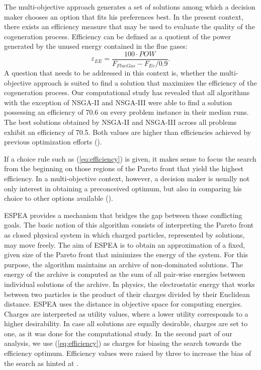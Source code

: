 The multi-objective approach generates a set of solutions among which a decision maker chooses an option that fits his preferences best. In the present context, there exists an efficiency measure that may be used to evaluate the quality of the cogeneration process. Efficiency can be defined as a quotient of the power generated by the unused energy contained in the flue gases:
%
\begin{equation}
\label{eq:efficiency}
\varepsilon_{EE} = \frac{100 \cdot POW}{F_{FlueGas} - F_{Ev}/0.9}.
\end{equation}
%
A question that needs to be addressed in this context is, whether the multi-objective approach is suited to find a solution that maximizes the efficiency of the cogeneration process. Our computational study has revealed that all algorithms with the exception of NSGA-II and NSGA-III were able to find a solution possessing an efficiency of 70.6 on every problem instance in their median runs. The best solutions obtained by NSGA-II and NSGA-III across all problems exhibit an efficiency of 70.5. Both values are higher than efficiencies achieved by previous optimization efforts (\cite{Seijo2016309}).

If a choice rule such as (\ref{eq:efficiency}) is given, it makes sense to focus the search from the beginning on those regions of the Pareto front that yield the highest efficiency. In a multi-objective context, however, a decision maker is usually not only interest in obtaining a preconceived optimum, but also in comparing his choice to other options available (\cite{roy1996multicriteria,kahneman1979prospect}).

ESPEA provides a mechanism that bridges the gap between those conflicting goals. The basic notion of this algorithm consists of interpreting the Pareto front as closed physical system in which charged particles, represented by solutions, may move freely. The aim of ESPEA is to obtain an approximation of a fixed, given size of the Pareto front that minimizes the energy of the system. For this purpose, the algorithm maintains an archive of non-dominated solutions. The energy of the archive is computed as the sum of all pair-wise energies between individual solutions of the archive. In physics, the electrostatic energy that works between two particles is the product of their charges divided by their Euclidean distance. ESPEA uses the distance in objective space for computing energies. Charges are interpreted as utility values, where a lower utility corresponds to a higher desirability. In case all solutions are equally desirable, charges are set to one, as it was done for the computational study. In the second part of our analysis, we use (\ref{eq:efficiency}) as charges for biasing the search towards the efficiency optimum. Efficiency values were raised by three to increase the bias of the search as hinted at \cite{espea}.

